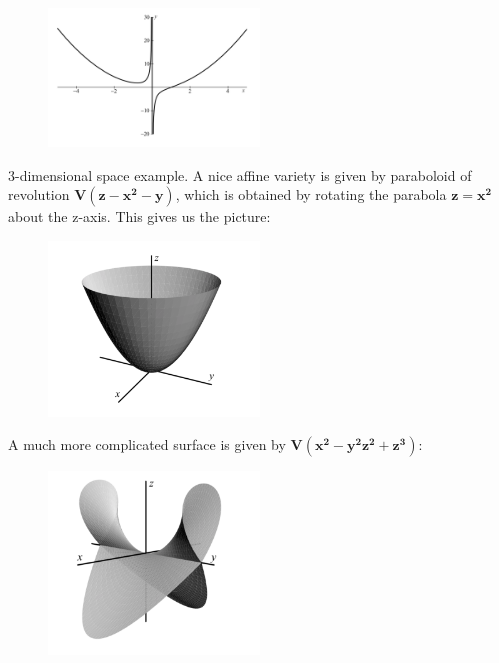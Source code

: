 \documentclass[11pt]{article}
\begin{document}
\begin{figure}[H]
  \begin{center}
    \includegraphics[width=0.50\textwidth]{conic.png}
    \caption{}
    \label{fig: }
  \end{center}
\end{figure}

3-dimensional space example. A nice affine variety is given by
paraboloid of revolution $\mathbf{V(z - x^2 - y)}$, which is obtained by rotating the parabola $\mathbf{z= x^2}$ about the z-axis.
This gives us the picture:

\begin{figure}[H]
  \begin{center}
    \includegraphics[width=0.50\textwidth]{threedimensinoal.png}
    \caption{}
    \label{fig: }
  \end{center}
\end{figure}

A much more complicated surface is given by $\mathbf{V(x^2 - y^2z^2 + z^3)}$:

\begin{figure}[H]
  \begin{center}
    \includegraphics[width=0.50\textwidth]{complicated.png}
    \caption{}
    \label{fig: }
  \end{center}
\end{figure}
\end{document}
